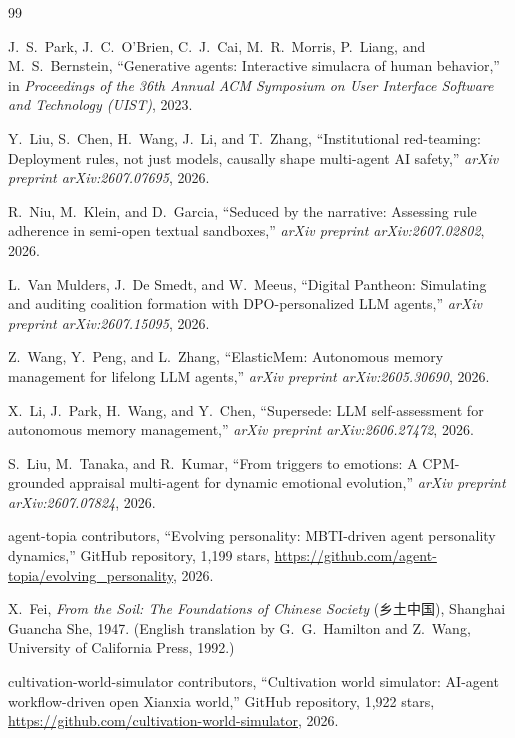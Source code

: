\documentclass[11pt]{article}
\begin{document}
\begin{thebibliography}{99}

J.~S.~Park, J.~C.~O'Brien, C.~J.~Cai, M.~R.~Morris, P.~Liang, and M.~S.~Bernstein,
``Generative agents: Interactive simulacra of human behavior,''
in \emph{Proceedings of the 36th Annual ACM Symposium on User Interface Software and Technology (UIST)}, 2023.

Y.~Liu, S.~Chen, H.~Wang, J.~Li, and T.~Zhang,
``Institutional red-teaming: Deployment rules, not just models, causally shape multi-agent AI safety,''
\emph{arXiv preprint arXiv:2607.07695}, 2026.

R.~Niu, M.~Klein, and D.~Garcia,
``Seduced by the narrative: Assessing rule adherence in semi-open textual sandboxes,''
\emph{arXiv preprint arXiv:2607.02802}, 2026.

L.~Van Mulders, J.~De Smedt, and W.~Meeus,
``Digital Pantheon: Simulating and auditing coalition formation with DPO-personalized LLM agents,''
\emph{arXiv preprint arXiv:2607.15095}, 2026.

Z.~Wang, Y.~Peng, and L.~Zhang,
``ElasticMem: Autonomous memory management for lifelong LLM agents,''
\emph{arXiv preprint arXiv:2605.30690}, 2026.

X.~Li, J.~Park, H.~Wang, and Y.~Chen,
``Supersede: LLM self-assessment for autonomous memory management,''
\emph{arXiv preprint arXiv:2606.27472}, 2026.

S.~Liu, M.~Tanaka, and R.~Kumar,
``From triggers to emotions: A CPM-grounded appraisal multi-agent for dynamic emotional evolution,''
\emph{arXiv preprint arXiv:2607.07824}, 2026.

agent-topia contributors,
``Evolving personality: MBTI-driven agent personality dynamics,''
GitHub repository, 1{,}199 stars, \url{https://github.com/agent-topia/evolving_personality}, 2026.

X.~Fei,
\emph{From the Soil: The Foundations of Chinese Society} (乡土中国),
Shanghai Guancha She, 1947.
(English translation by G.~G.~Hamilton and Z.~Wang, University of California Press, 1992.)

cultivation-world-simulator contributors,
``Cultivation world simulator: AI-agent workflow-driven open Xianxia world,''
GitHub repository, 1{,}922 stars, \url{https://github.com/cultivation-world-simulator}, 2026.


\end{thebibliography}
\end{document}
